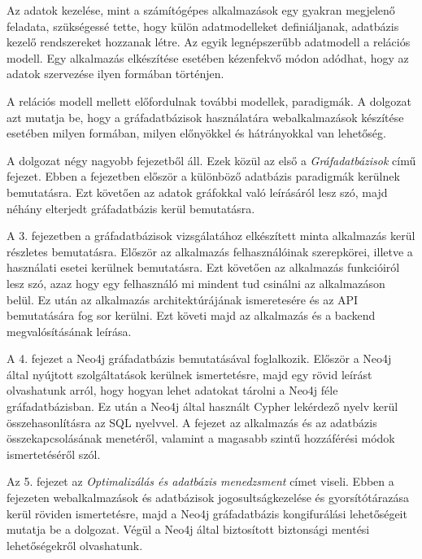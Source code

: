 
Az adatok kezelése, mint a számítógépes alkalmazások egy gyakran megjelenő feladata, szükségessé tette, hogy  külön adatmodelleket definiáljanak, adatbázis kezelő rendszereket hozzanak létre.
Az egyik legnépszerűbb adatmodell a relációs modell. Egy alkalmazás elkészítése esetében kézenfekvő módon adódhat, hogy az adatok szervezése ilyen formában történjen.

A relációs modell mellett előfordulnak további modellek, paradigmák. A dolgozat azt mutatja be, hogy a gráfadatbázisok használatára webalkalmazások készítése esetében milyen formában, milyen előnyökkel és hátrányokkal van lehetőség.





A dolgozat négy nagyobb fejezetből áll. Ezek közül az első a \textit{Gráfadatbázisok} című fejezet.
Ebben a fejezetben először a különböző adatbázis paradigmák kerülnek bemutatásra. Ezt követően az adatok gráfokkal való leírásáról lesz szó, majd néhány elterjedt gráfadatbázis kerül bemutatásra.

A 3. fejezetben a gráfadatbázisok vizsgálatához elkészített minta alkalmazás kerül részletes bemutatásra. Először az alkalmazás felhasználóinak szerepkörei, illetve a használati esetei kerülnek bemutatásra. Ezt követően az alkalmazás funkcióiról lesz szó, azaz hogy egy felhasználó mi mindent tud csinálni az alkalmazáson belül. Ez után az alkalmazás architektúrájának ismeretesére és az API bemutatására fog sor kerülni. Ezt követi majd az alkalmazás és a backend megvalósításának leírása.

A 4. fejezet a Neo4j gráfadatbázis bemutatásával foglalkozik. Először a Neo4j által nyújtott szolgáltatások kerülnek ismertetésre, majd egy rövid leírást olvashatunk arról, hogy hogyan lehet adatokat tárolni a Neo4j féle gráfadatbázisban. Ez után a Neo4j által használt Cypher lekérdező nyelv kerül összehasonlításra az SQL nyelvvel. A fejezet az alkalmazás és az adatbázis összekapcsolásának menetéről, valamint a magasabb szintű hozzáférési módok ismertetéséről szól.

Az 5. fejezet az \textit{Optimalizálás és adatbázis menedzsment} címet viseli. Ebben a fejezeten webalkalmazások és adatbázisok jogosultságkezelése és gyorsítótárazása kerül röviden ismertetésre, majd a Neo4j gráfadatbázis kongifurálási lehetőségeit mutatja be a dolgozat. Végül a Neo4j által biztosított biztonsági mentési lehetőségekről olvashatunk.
